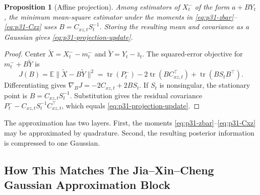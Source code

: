 \documentclass[11pt]{article}
\newtheorem{proposition}{Proposition}
\numberwithin{equation}{section}
\newcommand{\E}{\mathbb E}
\newcommand{\tr}{\operatorname{tr}}
\begin{document}
\begin{proposition}[Affine projection]
\label{prop:p31-affine-projection}
Among estimators of \(X_t^-\) of the form \(a+B Y_t\), the minimum mean-square
estimator under the moments in
\eqref{eq:p31-zbar}--\eqref{eq:p31-Cxz} uses \(B=C_{xz,t}S_t^{-1}\).  Storing
the resulting mean and covariance as a Gaussian gives
\eqref{eq:p31-projection-update}.
\end{proposition}

\begin{proof}
Center \(\widetilde X=X_t^- -m_t^-\) and
\(\widetilde Y=Y_t-\bar z_t\).  The squared-error objective for
\(m_t^-+B\widetilde Y\) is
\begin{equation}
  J(B)=\E\|\widetilde X-B\widetilde Y\|^2
  =
  \tr(P_t^-)-2\tr(BC_{xz,t}^\top)+\tr(BS_tB^\top).
  \label{eq:p31-affine-objective}
\end{equation}
Differentiating gives \(\nabla_BJ=-2C_{xz,t}+2BS_t\).  If \(S_t\) is
nonsingular, the stationary point is \(B=C_{xz,t}S_t^{-1}\).  Substitution gives
the residual covariance \(P_t^- - C_{xz,t}S_t^{-1}C_{xz,t}^\top\), which equals
\eqref{eq:p31-projection-update}.
\end{proof}

The approximation has two layers.  First, the moments
\eqref{eq:p31-zbar}--\eqref{eq:p31-Cxz} may be approximated by quadrature.
Second, the resulting posterior information is compressed to one Gaussian.

\subsection{How This Matches The Jia--Xin--Cheng Gaussian Approximation Block}
\label{subsec:p32-jia-gaussian-block}
\end{document}
